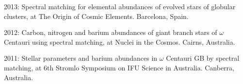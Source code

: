 \item[{\color{numcolor}\scriptsize3}] 2013: Spectral matching for elemental abundances of evolved stars of globular clusters, at The Origin of Cosmic Elements. Barcelona, Spain.
\item[{\color{numcolor}\scriptsize2}] 2012: Carbon, nitrogen and barium abundances of giant branch stars of $\omega$ Centauri using spectral matching, at Nuclei in the Cosmos. Cairns, Australia.
\item[{\color{numcolor}\scriptsize1}] 2011: Stellar parameters and barium abundances in $\omega$ Centauri GB by spectral matching, at  6th Stromlo Symposium on IFU Science in Australia. Canberra, Australia.
